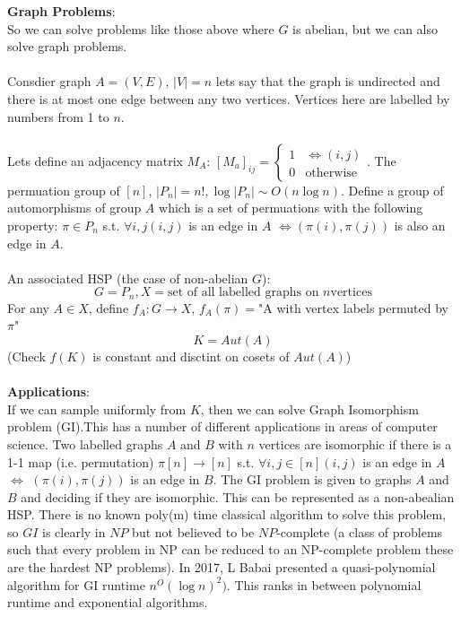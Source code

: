 \documentclass{article}
\begin{document}
\textbf{Graph Problems}:\\
So we can solve problems like those above where $G$ is abelian, but we can also solve graph problems.\\\\
Consdier graph $A = (V,E)$, $|V| = n$ lets say that the graph is undirected and there is at most one edge between any two vertices. Vertices here are labelled by numbers from 1 to $n$.\\\\
Lets define an adjacency matrix $M_A$: $[M_a]_{ij} = \begin{cases} 1 & \iff (i,j)\\ 0 & \text{otherwise} \end{cases}$. The permuation group of $[n]$, $|P_n| = n!, \log |P_n| \sim O(n \log n)$. Define a group of automorphisms of group $A$ which is a set of permuations with the following property: $\pi \in P_n$ s.t. $\forall i,j (i,j)$ is an edge in $A$ $\iff (\pi(i), \pi(j))$ is also an edge in $A$.\\\\
An associated HSP (the case of non-abelian $G$):
$$
G = P_n, X = \text{set of all labelled graphs on }n\text{vertices}
$$
For any $A \in X$, define $f_A: G \rightarrow X$, $f_A(\pi) = $"A with vertex labels permuted by $\pi$"
$$
K = Aut(A)
$$
(Check $f(K)$ is constant and disctint on cosets of $Aut(A)$)\\\\
\textbf{Applications}:\\
If we can sample uniformly from $K$, then we can solve Graph Isomorphism problem (GI).This has a number of different applications in areas of computer science. Two labelled graphs $A$ and $B$ with $n$ vertices are isomorphic if there is a 1-1 map (i.e. permutation) $\pi[n] \rightarrow [n]$ s.t. $\forall i,j \in [n] (i,j)$ is an edge in $A$ $\iff$ $(\pi(i), \pi(j))$ is an edge in $B$. The GI problem is given to graphs $A$ and $B$ and deciding if they are isomorphic. This can be represented as a non-abealian HSP. There is no known poly(m) time classical algorithm to solve this problem, so $GI$ is clearly in $NP$ but not believed to be $NP$-complete (a class of problems such that every problem in NP can be reduced to an NP-complete problem these are the hardest NP problems).
In 2017, L Babai presented a quasi-polynomial algorithm for GI runtime $n^O(\log n)^2)$. This ranks in between polynomial runtime and exponential algorithms.
\end{document}
